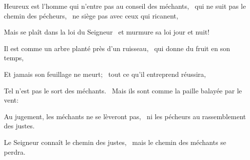 \item Heureux est l'homme qui n'entre pas au conseil des méchants,~\pscross{} qui ne suit pas le chemin des pécheurs,~\psstar{} ne siège pas avec ceux qui ricanent,
\item Mais se plaît dans la loi du Seigneur~\psstar{} et murmure sa loi jour et nuit!
\item Il est comme un arbre planté près d'un ruisseau,~\psstar{} qui donne du fruit en son temps,
\item Et jamais son feuillage ne meurt;~\psstar{} tout ce qu'il entreprend réussira,
\item Tel n'est pas le sort des méchants.~\psstar{} Mais ils sont comme la paille balayée par le vent:
\item Au jugement, les méchants ne se lèveront pas,~\psstar{} ni les pécheurs au rassemblement des justes.
\item Le Seigneur connaît le chemin des justes,~\psstar{} mais le chemin des méchants se perdra.